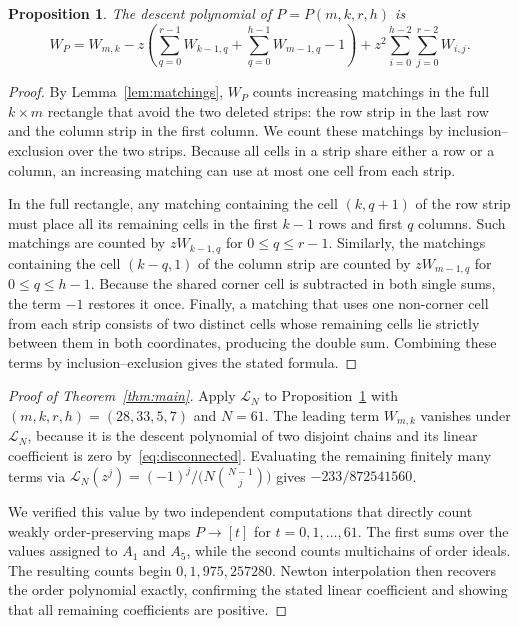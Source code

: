 \documentclass[11pt]{amsart}
\newtheorem{proposition}[theorem]{Proposition}
\theoremstyle{remark}
\numberwithin{equation}{section}
\begin{document}
\begin{proposition}\label{prop:W}
The descent polynomial of $P=P(m,k,r,h)$ is
\[
 W_P=W_{m,k}-z\left(\sum_{q=0}^{r-1}W_{k-1,q}+\sum_{q=0}^{h-1}W_{m-1,q}-1\right)
 +z^2\sum_{i=0}^{h-2}\sum_{j=0}^{r-2}W_{i,j}.
\]
\end{proposition}

\begin{proof}
By Lemma~\ref{lem:matchings}, $W_P$ counts increasing matchings in the full
$k\times m$ rectangle that avoid the two deleted strips: the row strip in the
last row and the column strip in the first column. We count these matchings by
inclusion--exclusion over the two strips. Because all cells in a strip share
either a row or a column, an increasing matching can use at most one cell from
each strip.

In the full rectangle, any matching containing the cell $(k,q+1)$ of the row
strip must place all its remaining cells in the first $k-1$ rows and first $q$
columns. Such matchings are counted by $zW_{k-1,q}$ for $0\le q\le r-1$.
Similarly, the matchings containing the cell $(k-q,1)$ of the column strip are
counted by $zW_{m-1,q}$ for $0\le q\le h-1$. Because the shared corner cell is
subtracted in both single sums, the term $-1$ restores it once. Finally, a
matching that uses one non-corner cell from each strip consists of two distinct
cells whose remaining cells lie strictly between them in both coordinates,
producing the double sum. Combining these terms by inclusion--exclusion gives
the stated formula.
\end{proof}

\begin{proof}[Proof of Theorem~\ref{thm:main}]
Apply $\mathcal L_N$ to Proposition~\ref{prop:W} with $(m,k,r,h)=(28,33,5,7)$
and $N=61$. The leading term $W_{m,k}$ vanishes under $\mathcal L_N$, because
it is the descent polynomial of two disjoint chains and its linear coefficient
is zero by~\eqref{eq:disconnected}. Evaluating the remaining finitely many
terms via $\mathcal L_N(z^j)=(-1)^j/\bigl(N\binom{N-1}{j}\bigr)$ gives
$-233/872541560$.

We verified this value by two independent computations that directly count
weakly order-preserving maps $P\to[t]$ for $t=0,1,\dots,61$. The first sums
over the values assigned to $A_1$ and $A_5$, while the second counts
multichains of order ideals. The resulting counts begin $0,1,975,257280$.
Newton interpolation then recovers the order polynomial exactly, confirming the
stated linear coefficient and showing that all remaining coefficients are
positive.
\end{proof}
\end{document}
